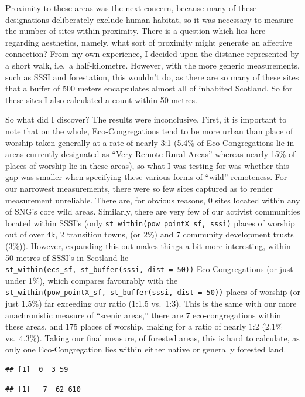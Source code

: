 \documentclass[11pt,]{article}
\begin{document}
Proximity to these areas was the next concern, because many of these
designations deliberately exclude human habitat, so it was necessary to
measure the number of sites within proximity. There is a question which
lies here regarding aesthetics, namely, what sort of proximity might
generate an affective connection? From my own experience, I decided upon
the distance represented by a short walk, i.e.~a half-kilometre.
However, with the more generic measurements, such as SSSI and
forestation, this wouldn't do, as there are so many of these sites that
a buffer of 500 meters encapsulates almost all of inhabited Scotland. So
for these sites I also calculated a count within 50 metres.

So what did I discover? The results were inconclusive. First, it is
important to note that on the whole, Eco-Congregations tend to be more
urban than place of worship taken generally at a rate of nearly 3:1
(5.4\% of Eco-Congregations lie in areas currently designated as ``Very
Remote Rural Areas'' whereas nearly 15\% of places of worship lie in
these areas), so what I was testing for was whether this gap was smaller
when specifying these various forms of ``wild'' remoteness. For our
narrowest measurements, there were so few sites captured as to render
measurement unreliable. There are, for obvious reasons, 0 sites located
within any of SNG's core wild areas. Similarly, there are very few of
our activist communities located within SSSI's (only
\texttt{st\_within(pow\_pointX\_sf,\ sssi)} places of worship out of
over 4k, 2 transition towns, (or 2\%) and 7 community development trusts
(3\%)). However, expanding this out makes things a bit more interesting,
within 50 metres of SSSI's in Scotland lie
\texttt{st\_within(ecs\_sf,\ st\_buffer(sssi,\ dist\ =\ 50))}
Eco-Congregations (or just under 1\%), which compares favourably with
the
\texttt{st\_within(pow\_pointX\_sf,\ st\_buffer(sssi,\ dist\ =\ 50))}
places of worship (or just 1.5\%) far exceeding our ratio (1:1.5
vs.~1:3). This is the same with our more anachronistic measure of
``scenic areas,'' there are 7 eco-congregations within these areas, and
175 places of worship, making for a ratio of nearly 1:2 (2.1\%
vs.~4.3\%). Taking our final measure, of forested areas, this is hard to
calculate, as only one Eco-Congregation lies within either native or
generally forested land.

\begin{verbatim}
## [1]  0  3 59
\end{verbatim}

\begin{verbatim}
## [1]   7  62 610
\end{verbatim}
\end{document}
